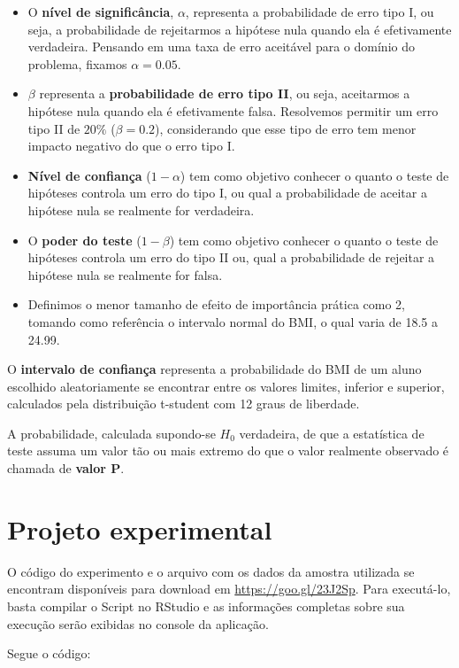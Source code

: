 \documentclass[12pt, a4paper]{article}
\begin{document}
\begin{itemize}
\item O \textbf{nível de significância}, $\alpha$, representa a probabilidade de erro tipo I, ou seja, a probabilidade de rejeitarmos a hipótese nula quando ela é efetivamente verdadeira. Pensando em uma taxa de erro aceitável para o domínio do problema, fixamos $\alpha = 0.05$.
\item $\beta$ representa a \textbf{probabilidade de erro tipo II}, ou seja, aceitarmos a hipótese nula quando ela é efetivamente falsa. Resolvemos permitir um erro tipo II de $20\%$ ($\beta = 0.2$), considerando que esse tipo de erro tem menor impacto negativo do que o erro tipo I.
\item \textbf{Nível de confiança} ($1 - \alpha$) tem como objetivo conhecer o quanto o teste de hipóteses controla um erro do tipo I, ou qual a probabilidade de aceitar a hipótese nula se realmente for verdadeira. 
\item O \textbf{poder do teste} ($1 - \beta$) tem como objetivo conhecer o quanto o teste de hipóteses controla um erro do tipo II ou, qual a probabilidade de rejeitar a hipótese nula se realmente for falsa.
\item Definimos o menor tamanho de efeito de importância prática como 2, tomando como referência o intervalo normal do BMI, o qual varia de 18.5 a 24.99.
\end{itemize}

\par O \textbf{intervalo de confiança} representa a probabilidade do BMI de um aluno escolhido aleatoriamente se encontrar entre os valores limites, inferior e superior, calculados pela distribuição t-student com 12 graus de liberdade.
\par A probabilidade, calculada supondo-se $H_{0}$ verdadeira, de que a estatística de teste assuma um valor tão ou mais extremo do que o valor realmente observado é chamada de \textbf{valor P}.

\section{Projeto experimental}
\label{sec:projeto-experimental}
O código do experimento e o arquivo com os dados da amostra utilizada se encontram disponíveis para download em \url{https://goo.gl/23J2Sp}. Para executá-lo, basta compilar o Script no RStudio e as informações completas sobre sua execução serão exibidas no console da aplicação.
\par Segue o código:
\end{document}
